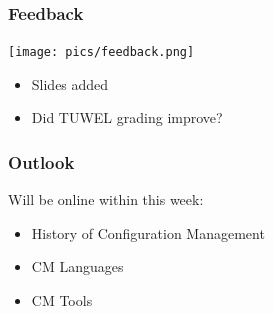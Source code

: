\begin{frame}
	\frametitle{Feedback}
	\hfill \texttt{[image: pics/feedback.png]}
	\vspace{-1cm}
	\begin{itemize}
		\item Slides added
		\item Did TUWEL grading improve?
	\end{itemize}
\end{frame}


\begin{frame}
	\frametitle{Outlook}

	Will be online within this week:
	\begin{itemize}[<+-| alert@+>]
	\item History of Configuration Management
	\item CM Languages
	\item CM Tools
	\end{itemize}
\end{frame}



\appendix

\begin{frame}[allowframebreaks]
	
	
\end{frame}



